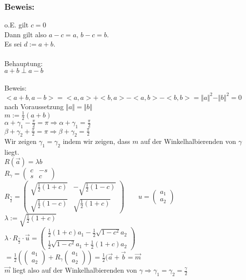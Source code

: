 \subsubsection{Beweis:}
o.E. gilt $c=0$\\
Dann gilt also $a-c=a, \, b-c=b$.\\
Es sei $d:=a+b$. \\
\qquad\\
Behauptung:\\
 $a+b\perp a-b$\\
 \qquad\\
Beweis:\\
$<a+b,a-b>=<a,a>+<b,a>-<a,b>-<b,b>=\Vert a \Vert^{2}-\Vert b \Vert^{2} = 0$ nach Voraussetzung $\Vert a \Vert = \Vert b \Vert$\\
%
%
%
%
$m:=\frac{1}{2}(a+b)$\\
$\alpha + \gamma_{1} - \frac{\pi}{2}=\pi \Rightarrow \alpha + \gamma_{1} = \frac{\pi}{2}$\\
$\beta+\gamma_{2}+\frac{\pi}{2}=\pi\Rightarrow\beta+\gamma_{2}=\frac{\pi}{2}$\\
Wir zeigen $\gamma_{1}=\gamma_{2}$ indem wir zeigen, dass $m$ auf der Winkelhalbierenden von $\gamma$ liegt. \\
$R(\vec{a})=\lambda b$\\
$R_{\gamma}=\begin{pmatrix} c & -s \\ s & c \end{pmatrix}$\\
$R_{\frac{\gamma}{2}}=\begin{pmatrix} \sqrt{\frac{1}{2} (1+c)} & - \sqrt{\frac{1}{2}(1-c)} \\ \sqrt{\frac{1}{2}(1-c)} & \sqrt{\frac{1}{2}(1+c)}\end{pmatrix} \qquad u=\begin{pmatrix} a_{1} \\ a_{2} \end{pmatrix}$\\
$\lambda :=\sqrt{\frac{1}{2}(1+c)}$\\
$\lambda \cdot R_{\frac{\gamma}{2}} \cdot \vec{u} = \begin{pmatrix} \frac{1}{2} (1+c)a_{1} -\frac{1}{2}\sqrt{1-c^{2}}a_{2} \\ \frac{1}{2}\sqrt{1-c^{2}}a_{1} + \frac{1}{2}(1+c)a_{2}\end{pmatrix}$\\
$= \frac{1}{2}(\begin{pmatrix}a_{1} \\ a_{2} \end{pmatrix} + R_{\gamma} \begin{pmatrix} a_{1} \\ a_{2} \end{pmatrix} ) = \frac{1}{2}(\vec{a}+\vec{b}=\vec{m}$\\
$\vec{m}$ liegt also auf der Winkelhalbierenden von $\gamma \Rightarrow \gamma_{1} = \gamma_{2} = \frac{\gamma}{2}$